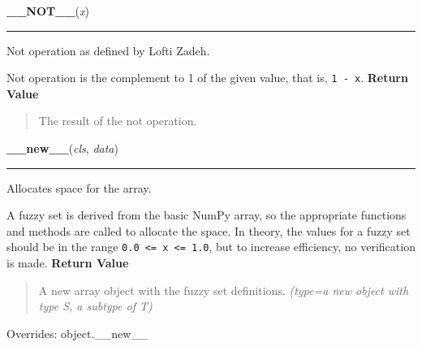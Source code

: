     \label{peach:fuzzy:norms:ZadehNot}

    \vspace{0.5ex}

\hspace{.8\funcindent}\begin{boxedminipage}{\funcwidth}

    \raggedright \textbf{\_\_NOT\_\_}(\textit{x})

    \vspace{-1.5ex}

    \rule{\textwidth}{0.5\fboxrule}
\setlength{\parskip}{2ex}

Not operation as defined by Lofti Zadeh.

Not operation is the complement to 1 of the given value, that is, \texttt{1 - x}.
\setlength{\parskip}{1ex}
      \textbf{Return Value}
    \vspace{-1ex}

      \begin{quote}

The result of the not operation.
      \end{quote}

    \end{boxedminipage}

    \vspace{0.5ex}

\hspace{.8\funcindent}\begin{boxedminipage}{\funcwidth}

    \raggedright \textbf{\_\_new\_\_}(\textit{cls}, \textit{data})

    \vspace{-1.5ex}

    \rule{\textwidth}{0.5\fboxrule}
\setlength{\parskip}{2ex}

Allocates space for the array.

A fuzzy set is derived from the basic NumPy array, so the appropriate
functions and methods are called to allocate the space. In theory, the
values for a fuzzy set should be in the range \texttt{0.0 <= x <= 1.0}, but
to increase efficiency, no verification is made.
\setlength{\parskip}{1ex}
      \textbf{Return Value}
    \vspace{-1ex}

      \begin{quote}

A new array object with the fuzzy set definitions.
      {\it (type=a new object with type S, a subtype of T)}

      \end{quote}

      Overrides: object.\_\_new\_\_

    \end{boxedminipage}

